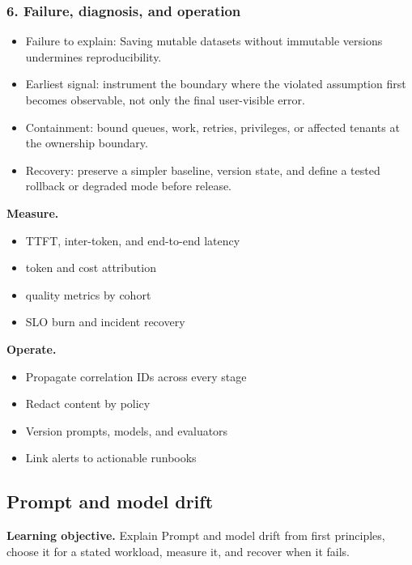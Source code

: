 \subsubsection*{6. Failure, diagnosis, and operation}
\begin{itemize}
\item Failure to explain: Saving mutable datasets without immutable versions undermines reproducibility.
\item Earliest signal: instrument the boundary where the violated assumption first becomes observable, not only the final user-visible error.
\item Containment: bound queues, work, retries, privileges, or affected tenants at the ownership boundary.
\item Recovery: preserve a simpler baseline, version state, and define a tested rollback or degraded mode before release.
\end{itemize}
\textbf{Measure.}\begin{itemize}
\item TTFT, inter-token, and end-to-end latency
\item token and cost attribution
\item quality metrics by cohort
\item SLO burn and incident recovery
\end{itemize}
\textbf{Operate.}\begin{itemize}
\item Propagate correlation IDs across every stage
\item Redact content by policy
\item Version prompts, models, and evaluators
\item Link alerts to actionable runbooks
\end{itemize}
\subsection{Prompt and model drift}
\textbf{Learning objective.} Explain Prompt and model drift from first principles, choose it for a stated workload, measure it, and recover when it fails.

